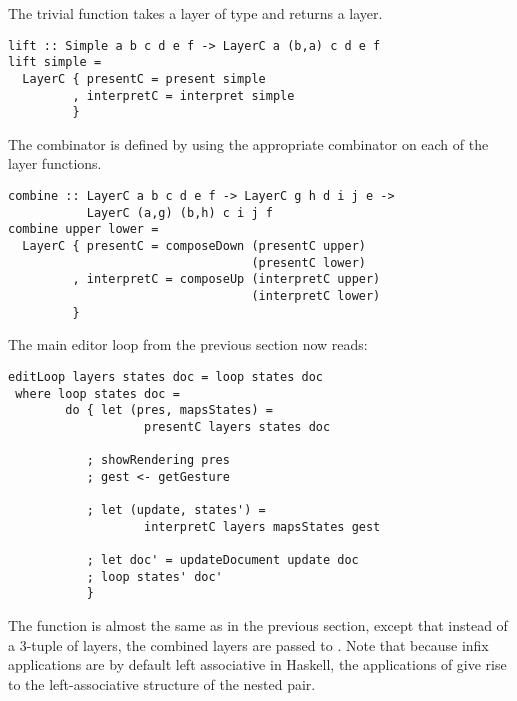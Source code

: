 \documentclass[preprint,natbib]{sigplanconf}
\begin{document}
The trivial function  takes a layer of type  and returns a  layer.

\begin{small}
\begin{verbatim}
lift :: Simple a b c d e f -> LayerC a (b,a) c d e f
lift simple = 
  LayerC { presentC = present simple
         , interpretC = interpret simple
         }
\end{verbatim}
\end{small}

The  combinator is defined by using the appropriate  combinator on each of the layer functions. 

\begin{small}
\begin{verbatim}
combine :: LayerC a b c d e f -> LayerC g h d i j e -> 
           LayerC (a,g) (b,h) c i j f
combine upper lower =
  LayerC { presentC = composeDown (presentC upper) 
                                  (presentC lower)
         , interpretC = composeUp (interpretC upper) 
                                  (interpretC lower)
         }
\end{verbatim}
\end{small}



The main editor loop from the previous section now reads:
 
\begin{small}
\begin{verbatim}
editLoop layers states doc = loop states doc
 where loop states doc = 
        do { let (pres, mapsStates) = 
                   presentC layers states doc
           
           ; showRendering pres
           ; gest <- getGesture
 
           ; let (update, states') = 
                   interpretC layers mapsStates gest
       
           ; let doc' = updateDocument update doc
           ; loop states' doc'
           }
\end{verbatim}
\end{small}

The  function is almost the same as in the previous section, except that instead of a 3-tuple of layers, the combined layers are passed to . Note that because infix applications are by default left associative in Haskell, the applications of  give rise to the left-associative structure of the nested pair.
\end{document}
